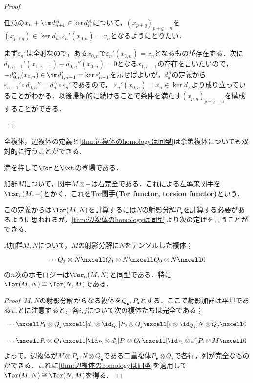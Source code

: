 \begin{proof}
\begin{step}
		任意の$x_n+\im d_{n+1}^A\in\ker d_n^A$について，$(x_{p+q})_{p+q=n}$を$(x_{p+q})\in\ker d_n,\varepsilon_n'(x_{0,n})=x_n$となるようにとりたい．
		
		まず$\varepsilon_n'$は全射なので，ある$x_{0,n}$で$\varepsilon_n'(x_{0,n})=x_n$となるものが存在する．次に$d_{1,n-1}'(x_{1,n-1})+d_{0,n}''(x_{0,n})=0$となる$x_{1,n-1}$の存在を言いたいので，$-d_{0,n}''(x_{0,n})\in\im d_{1,n-1}'=\ker\varepsilon_{n-1}'$を示せばよいが，$d_n^A$の定義から$\varepsilon_{n-1}'\circ d_{0,n}''=d_n^A\circ\varepsilon_n'$であるので， $\varepsilon_n'(x_{0,n})=x_n\in\ker d_A$より成り立っていることがわかる．以後帰納的に続けることで条件を満たす$(x_{p,q})_{p+q=n}$を構成することができる．
		
	\end{step}
\end{proof}

全複体，辺複体の定義と\ref{thm:辺複体のhomologyは同型}は余鎖複体についても双対的に行うことができる．

満を持して$\Tor$と$\Ext$の登場である．
\begin{defi}[$\Tor$関手]
	加群$M$について，関手$M\otimes -$は右完全である．これによる左導来関手を$\Tor_n(M,-)$とかく．これをTor\textbf{関手(Tor functor, torsion functor)}という．
\end{defi}

この定義からは$\Tor(M,N)$を計算するには$N$の射影分解$P_\bullet$を計算する必要があるように思われるが，\ref{thm:辺複体のhomologyは同型}より次の定理を言うことができる．

\begin{thm}
	$A$加群$M,N$について，$M$の射影分解に$N$をテンソルした複体；
	\[\begin{tikzcd}
		\cdots Q_2\otimes N\nxcell Q_1\otimes N\nxcell Q_0\otimes N\nxcell0
	\end{tikzcd}\]
	の$n$次のホモロジーは$\Tor_n(M,N)$と同型である．特に$\Tor(M,N)\cong\Tor(N,M)$である．
\end{thm}

\begin{proof}
	$M,N$の射影分解からなる複体を$Q_\bullet,P_\bullet$とする．ここで射影加群は平坦であることに注意すると，各$i,j$について次の複体たちは完全である；
	\[\begin{tikzcd}
		\cdots\nxcell P_1\otimes Q_j\nxcell[d_1\otimes\id_{Q_j}] P_0\otimes Q_j\nxcell[\varepsilon\otimes\id_{Q_j}]N\otimes Q_j\nxcell0
	\end{tikzcd}\]
	\[\begin{tikzcd}
		\cdots\nxcell P_i\otimes Q_1\nxcell[\id_{P_i}\otimes d_1'] P_i\otimes Q_0\nxcell[\id_{P_i}\otimes\varepsilon']P_i\otimes M\nxcell0
	\end{tikzcd}\]
	よって，辺複体が$M\otimes P_\bullet,N\otimes Q_\bullet$である二重複体$P_\bullet\otimes Q_\ast$で各行，列が完全なものができる．これに\ref{thm:辺複体のhomologyは同型}を適用して$\Tor(M,N)\cong\Tor(N,M)$を得る．
\end{proof}

